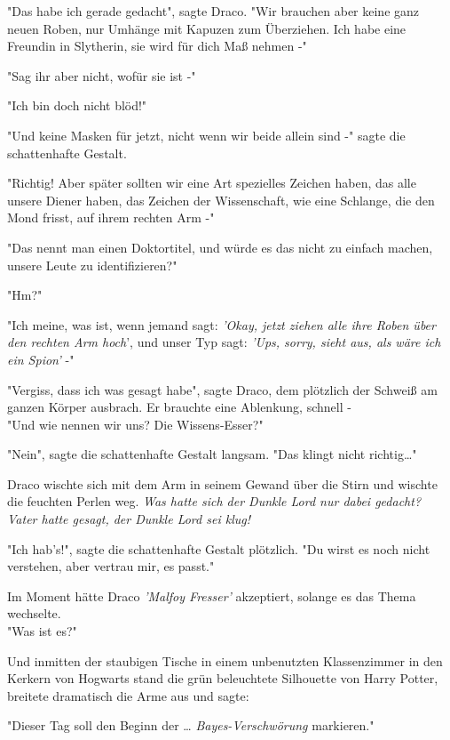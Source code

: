 {"Das habe ich gerade gedacht", sagte Draco. "Wir brauchen aber keine ganz neuen Roben, nur Umhänge mit Kapuzen zum Überziehen. Ich habe eine Freundin in Slytherin, sie wird für dich Maß nehmen -"

"Sag ihr aber nicht, wofür sie ist -"

"Ich bin doch nicht blöd!"

"Und keine Masken für jetzt, nicht wenn wir beide allein sind -" sagte die schattenhafte Gestalt.

"Richtig! Aber später sollten wir eine Art spezielles Zeichen haben, das alle unsere Diener haben, das Zeichen der Wissenschaft, wie eine Schlange, die den Mond frisst, auf ihrem rechten Arm -"

"Das nennt man einen Doktortitel, und würde es das nicht zu einfach machen, unsere Leute zu identifizieren?"

"Hm?"

"Ich meine, was ist, wenn jemand sagt: \emph{'Okay, jetzt ziehen alle ihre Roben über den rechten Arm hoch}', und unser Typ sagt: \emph{'Ups, sorry, sieht aus, als wäre ich ein Spion'} -"

"Vergiss, dass ich was gesagt habe", sagte Draco, dem plötzlich der Schweiß am ganzen Körper ausbrach. Er brauchte eine Ablenkung, schnell -\\ "Und wie nennen wir uns? Die Wissens-Esser?"

"Nein", sagte die schattenhafte Gestalt langsam. "Das klingt nicht richtig…"

Draco wischte sich mit dem Arm in seinem Gewand über die Stirn und wischte die feuchten Perlen weg. \emph{Was hatte sich der Dunkle Lord nur dabei gedacht? Vater hatte gesagt, der Dunkle Lord sei klug!}

"Ich hab's!", sagte die schattenhafte Gestalt plötzlich. "Du wirst es noch nicht verstehen, aber vertrau mir, es passt."

Im Moment hätte Draco \emph{'Malfoy Fresser'} akzeptiert, solange es das Thema wechselte.\\ "Was ist es?"

Und inmitten der staubigen Tische in einem unbenutzten Klassenzimmer in den Kerkern von Hogwarts stand die grün beleuchtete Silhouette von Harry Potter, breitete dramatisch die Arme aus und sagte:

"Dieser Tag soll den Beginn der … \emph{Bayes-Verschwörung} markieren."

}
